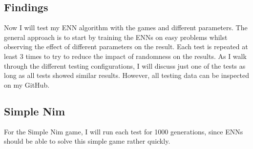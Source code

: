\documentclass[11pt]{report}
\begin{document}
\begin{enumerate}
    \section{Findings}\label{sec:first-findings}
    Now I will test my ENN algorithm with the games and different parameters.
    The general approach is to start by training the ENNs on easy problems whilst observing the effect of different parameters on the result.
    Each test is repeated at least 3 times to try to reduce the impact of randomness on the results.
    As I walk through the different testing configurations, I will discuss just one of the tests as long as all tests showed similar results.
    However, all testing data can be inspected on my GitHub.

    \subsection{Simple Nim}\label{subsec:simple-nim-results}
    For the Simple Nim game, I will run each test for 1000 generations, since ENNs should be able to solve this simple game rather quickly.


\end{enumerate}
\end{document}
